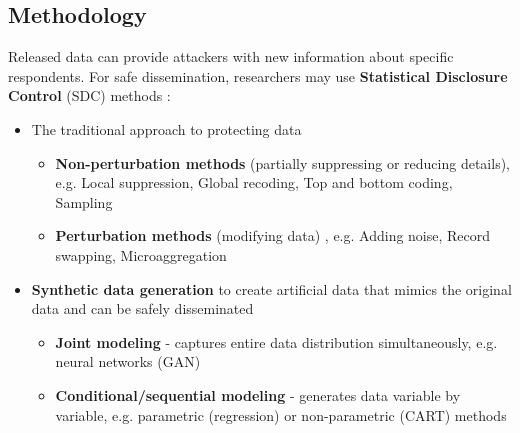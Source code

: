 \documentclass[a0,portrait]{a0poster}
\begin{document}
\begin{multicols}{3}
\section{Methodology}



Released data can provide attackers with new information about specific respondents. For safe dissemination, researchers may use \textbf{Statistical Disclosure Control} (SDC) methods \cite{2017_Templ}:

\begin{itemize}
    \item[\ding{228}] The traditional approach to protecting data
        \begin{itemize}
            \item[\textbullet] \textbf{Non-perturbation methods} (partially suppressing or reducing details), e.g. Local suppression, %
            Global recoding, %
            Top and bottom coding, Sampling  
            \item[\textbullet] \textbf{Perturbation methods} (modifying data)%
            , e.g. Adding noise, Record swapping,  Microaggregation
        \end{itemize}   
\end{itemize}

\begin{itemize}
     \item[\ding{228}] \textbf{Synthetic data generation} to create artificial data that mimics the original data and can be safely disseminated
        \begin{itemize}
            \item[\textbullet] \textbf{Joint modeling}  - captures entire data distribution simultaneously, e.g. neural networks (GAN)
            \item[\textbullet] \textbf{Conditional/sequential modeling} - generates data variable by variable, e.g. parametric (regression) or non-parametric (CART) methods
        \end{itemize}        
\end{itemize}


\end{multicols}
\end{document}
